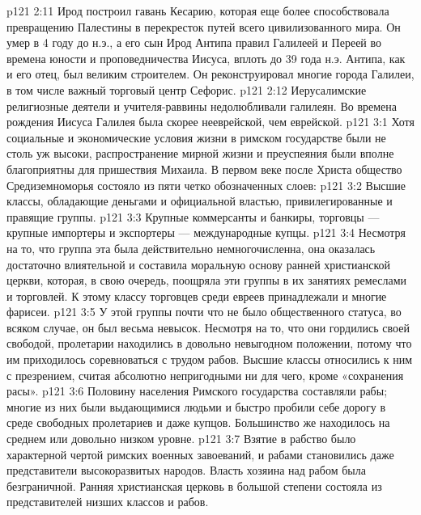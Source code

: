 \vs p121 2:11 Ирод построил гавань Кесарию, которая еще более способствовала превращению Палестины в перекресток путей всего цивилизованного мира. Он умер в 4 году до н.э., а его сын Ирод Антипа правил Галилеей и Переей во времена юности и проповедничества Иисуса, вплоть до 39 года н.э. Антипа, как и его отец, был великим строителем. Он реконструировал многие города Галилеи, в том числе важный торговый центр Сефорис.
\vs p121 2:12 Иерусалимские религиозные деятели и учителя\hyp{}раввины недолюбливали галилеян. Во времена рождения Иисуса Галилея была скорее нееврейской, чем еврейской.
\vs p121 3:1 Хотя социальные и экономические условия жизни в римском государстве были не столь уж высоки, распространение мирной жизни и преуспеяния были вполне благоприятны для пришествия Михаила. В первом веке после Христа общество Средиземноморья состояло из пяти четко обозначенных слоев:
\vs p121 3:2 \bibnobreakspace {} Высшие классы, обладающие деньгами и официальной властью, привилегированные и правящие группы.
\vs p121 3:3 \bibnobreakspace {} Крупные коммерсанты и банкиры, торговцы --- крупные импортеры и экспортеры --- международные купцы.
\vs p121 3:4 \bibnobreakspace {} Несмотря на то, что группа эта была действительно немногочисленна, она оказалась достаточно влиятельной и составила моральную основу ранней христианской церкви, которая, в свою очередь, поощряла эти группы в их занятиях ремеслами и торговлей. К этому классу торговцев среди евреев принадлежали и многие фарисеи.
\vs p121 3:5 \bibnobreakspace {} У этой группы почти что не было общественного статуса, во всяком случае, он был весьма невысок. Несмотря на то, что они гордились своей свободой, пролетарии находились в довольно невыгодном положении, потому что им приходилось соревноваться с трудом рабов. Высшие классы относились к ним с презрением, считая абсолютно непригодными ни для чего, кроме «сохранения расы».
\vs p121 3:6 \bibnobreakspace {} Половину населения Римского государства составляли рабы; многие из них были выдающимися людьми и быстро пробили себе дорогу в среде свободных пролетариев и даже купцов. Большинство же находилось на среднем или довольно низком уровне.
\vs p121 3:7 Взятие в рабство было характерной чертой римских военных завоеваний, и рабами становились даже представители высокоразвитых народов. Власть хозяина над рабом была безграничной. Ранняя христианская церковь в большой степени состояла из представителей низших классов и рабов.
